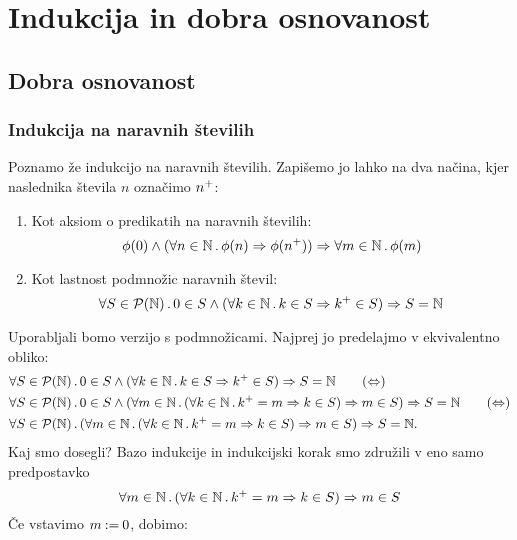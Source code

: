 \chapter{Indukcija in dobra osnovanost}

\section{Dobra osnovanost}

\subsection{Indukcija na naravnih številih}

Poznamo že indukcijo na naravnih številih. Zapišemo jo lahko na dva načina,
kjer naslednika števila $n$ označimo ${n^{+}}$:
%
\begin{enumerate}
\item Kot aksiom o predikatih na naravnih številih:
  \begin{equation*}
  \phi(0) \land (\forall n \in \mathbb{N} \,.\, \phi(n) \Rightarrow \phi({n^{+}})) \Rightarrow \forall m \in \mathbb{N} \,.\, \phi(m)
  \end{equation*}

\item Kot lastnost podmnožic naravnih števil:
  \begin{equation*}
    \forall S \in \mathcal{P}(\mathbb{N}) \,.\, 0 \in S \land (\forall k \in \mathbb{N} \,.\, k \in S \Rightarrow {k^{+}} \in S) \Rightarrow S = \mathbb{N}
  \end{equation*}
\end{enumerate}
%
Uporabljali bomo verzijo s podmnožicami. Najprej jo predelajmo v ekvivalentno obliko:
%
\begin{align}
  &\all{S \in \pow{\NN}} 0 \in S \land (\all{k \in \NN} k \in S \lthen \suc{k} \in S) \lthen S = \NN \tag{$\liff$} \\
  &\all{S \in \pow{\NN}} 0 \in S \land (\all{m \in \NN} (\all{k \in \NN} \suc{k} = m \lthen k \in S) \lthen m \in S) \lthen S = \NN \tag{$\liff$} \\
  &\all{S \in \pow{\NN}} (\all{m \in \NN} (\all{k \in \NN} \suc{k} = m \lthen k \in S) \lthen m \in S) \lthen S = \NN. \notag
\end{align}
%
Kaj smo dosegli? Bazo indukcije in indukcijski korak smo združili v eno samo predpostavko
%
\begin{equation}
  \label{eq:ind-N}
  \forall m \in \mathbb{N} \,.\, (\forall k \in \mathbb{N} \,.\, {k^{+}} = m \Rightarrow k \in S) \Rightarrow m \in S
\end{equation}
%
Če vstavimo $m \mathbin{{:}{=}} 0$, dobimo:
